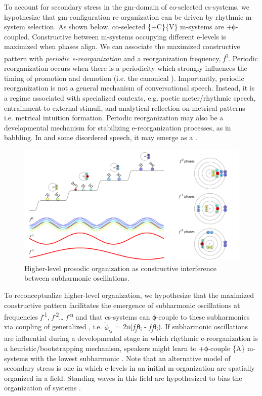   To account for secondary stress in the gm-domain of co-selected cs-systems, we hypothesize that gm-con\-fig\-u\-ra\-tion re-organization can be driven by rhythmic m-sys\-tem selection. As shown below, co-selected \{+C\}\{V\} m-sys\-tems are +ϕ-coupled. Constructive  between m-sys\-tems occupying different e-levels is maximized when  phases align. We can associate the maximized constructive  pattern with \textit{periodic e-reorganization} and a reorganization frequency, \textit{f}\textsuperscript{0}. Periodic reorganization occurs when there is a periodicity which strongly influences the timing of promotion and demotion (i.e. the canonical ). Importantly, periodic reorganization is not a general mechanism of conversational speech. Instead, it is a regime associated with specialized contexts, e.g. poetic meter/rhythmic speech, entrainment to external stimuli, and analytical reflection on metrical patterns -- i.e. metrical intuition formation. Periodic reorganization may also be a developmental mechanism for stabilizing e-reorganization processes, as in babbling. In  and some disordered speech, it may emerge as a .

  
\begin{figure}
\includegraphics[width=\textwidth]{figures/Tilsen-img64.png}
\caption{Higher-level prosodic organization as constructive interference between subharmonic oscillations.}
\label{fig:4:14}
\end{figure}
 

  To reconceptualize higher-level  organization, we hypothesize that the maximized constructive  pattern facilitates the emergence of subharmonic oscillations at frequencies \textit{f}\textsuperscript{{}-1}, \textit{f}\textsuperscript{{}-2}… \textit{f}\textsuperscript{{}-n} and that cs-systems can ϕ-couple to these subharmonics via coupling of generalized , i.e. $\tilde{\phi}_{ij}$ = 2π(\textit{f}\textsubscript{j}θ\textsubscript{i} - \textit{f}\textsubscript{j}θ\textsubscript{i}). If subharmonic oscillations are influential during a developmental stage in which rhythmic e-reorganization is a heuristic/bootstrapping mechanism, speakers might learn to +ϕ-couple \{A\} m-sys\-tems with the lowest subharmonic . Note that an alternative model of secondary stress is one in which e-levels in an initial m-organization are spatially organized in a field. Standing waves in this field are hypothesized to bias the organization of  systems \citep{Tilsen2018b}.

